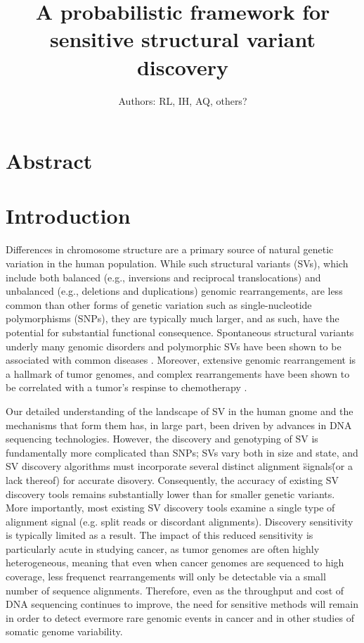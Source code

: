 \documentclass[11pt]{article}
\begin{document}
\title{A probabilistic framework for sensitive structural variant discovery}
\author{Authors: RL, IH, AQ, others?}
\maketitle


\section{Abstract}



\section{Introduction}

Differences in chromosome structure are a primary source of natural 
genetic variation in the human population. While such structural variants (SVs),
which include both balanced (e.g., inversions and reciprocal translocations)
and unbalanced (e.g., deletions and duplications) genomic rearrangements, are 
less common than other forms of genetic variation such as single-nucleotide 
polymorphisms (SNPs), they are typically much larger, and as such, have the 
potential for substantial functional consequence. Spontaneous structural
variants underly many genomic disorders and polymorphic SVs have been shown to
be associated with common diseases \cite{McCarroll2008}. Moreover, extensive
genomic rearrangement is a hallmark of tumor genomes, and complex rearrangements
have been shown to be correlated with a tumor's respinse to chemotherapy
\cite{Rausch2012}.

Our detailed understanding of the landscape of SV in the human gnome and the
mechanisms that form them has, in large part, been driven by advances in DNA
sequencing technologies. However, the discovery and genotyping of SV is 
fundamentally more complicated than SNPs; SVs vary both in size and state, 
and SV  discovery algorithms must incorporate several distinct alignment 
\"signals\" (or a lack thereof) for accurate disovery. Consequently, the
accuracy of existing SV discovery tools remains substantially lower than for
smaller genetic variants. More importantly, most existing SV discovery
tools examine a single type of alignment signal (e.g. split reads or discordant
alignments). Discovery sensitivity is typically limited as a result. The
impact of this reduced sensitivity is particularly acute in studying cancer,
as tumor genomes are often highly heterogeneous, meaning that even when cancer
genomes are sequenced to high coverage, less frequenct rearrangements will
only be detectable via a small number of sequence alignments. Therefore,
even as the throughput and cost of DNA sequencing continues to improve, the
need for sensitive methods will remain in order to detect evermore rare
genomic events in cancer and in other studies of somatic genome variability.
\end{document}
